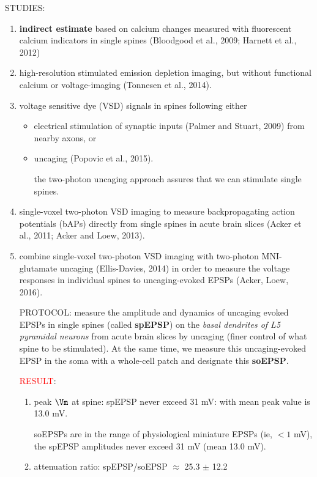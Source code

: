 STUDIES:
\begin{enumerate}
  \item {\bf indirect estimate} based on calcium changes measured with
  fluorescent calcium indicators in single spines (Bloodgood et al., 2009;
  Harnett et al., 2012) 

  \item high-resolution stimulated emission depletion imaging, but without
  functional calcium or voltage-imaging (Tonnesen et al., 2014).

  \item voltage sensitive dye (VSD) signals in spines following either
  
  \begin{itemize}
    \item  electrical stimulation of synaptic inputs (Palmer and Stuart, 2009)
    from nearby axons, or
    
    
    
    \item uncaging (Popovic et al., 2015).
    
    the two-photon uncaging approach assures that we can stimulate single
    spines.
  \end{itemize}

  \item single-voxel two-photon VSD imaging to measure backpropagating action
  potentials (bAPs) directly from single spines in acute brain slices (Acker et
  al., 2011; Acker and Loew, 2013). 
  
  \item combine single-voxel two-photon VSD imaging with two-photon
  MNI-glutamate uncaging (Ellis-Davies, 2014) in order to measure the voltage
  responses in individual spines to uncaging-evoked EPSPs (Acker, Loew, 2016).
  
  PROTOCOL: measure the amplitude and dynamics of uncaging evoked EPSPs in
  single spines (called {\bf spEPSP}) on the {\it basal dendrites of L5
  pyramidal neurons} from acute brain slices by uncaging (finer control of what
  spine to be stimulated). At the same time, we measure this uncaging-evoked
  EPSP in the soma with a whole-cell patch and designate this {\bf soEPSP}.

  \textcolor{red}{RESULT}:
  \begin{enumerate}
    \item peak $\Vm$ at spine: spEPSP never exceed 31 mV: with mean peak value
    is 13.0 mV.
    
    soEPSPs are in the range of physiological miniature EPSPs (ie, $< 1$ mV),
    the spEPSP amplitudes never exceed 31 mV (mean 13.0 mV).
    
    \item attenuation ratio: spEPSP/soEPSP $\approx$ 25.3 $\pm$ 12.2
    
  \end{enumerate}
  

\end{enumerate}

